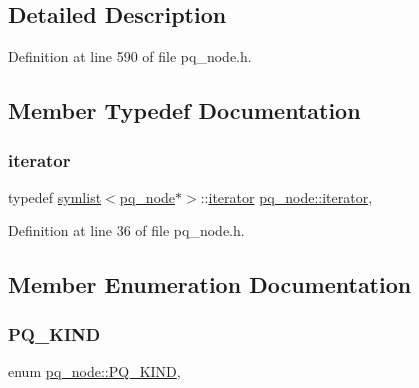\subsection{Detailed Description}


Definition at line 590 of file pq\+\_\+node.\+h.



\subsection{Member Typedef Documentation}
\mbox{\label{classpq__node_a34898c9eb1527787c07e8ebefd6bfba5}} 
\subsubsection{\texorpdfstring{iterator}{iterator}}
{\footnotesize\ttfamily typedef \mbox{\hyperlink{classsymlist}{symlist}}$<$\mbox{\hyperlink{classpq__node}{pq\+\_\+node}}$\ast$$>$\+::\mbox{\hyperlink{classpq__node_a34898c9eb1527787c07e8ebefd6bfba5}{iterator}} \mbox{\hyperlink{classpq__node_a34898c9eb1527787c07e8ebefd6bfba5}{pq\+\_\+node\+::iterator}}\hspace{0.3cm}{\ttfamily [protected]}, {\ttfamily [inherited]}}



Definition at line 36 of file pq\+\_\+node.\+h.



\subsection{Member Enumeration Documentation}
\mbox{\label{classpq__node_a96827bdca8bf81d20213405dd27f8fa6}} 
\subsubsection{\texorpdfstring{P\+Q\+\_\+\+K\+I\+ND}{PQ\_KIND}}
{\footnotesize\ttfamily enum \mbox{\hyperlink{classpq__node_a96827bdca8bf81d20213405dd27f8fa6}{pq\+\_\+node\+::\+P\+Q\+\_\+\+K\+I\+ND}}\hspace{0.3cm}{\ttfamily [protected]}, {\ttfamily [inherited]}}

